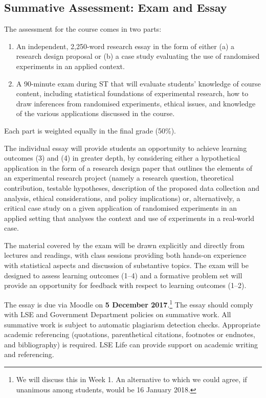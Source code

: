 \documentclass[12pt,a4paper]{article}
\begin{document}
\subsection{Summative Assessment: Exam and Essay}

The assessment for the course comes in two parts:

\begin{enumerate}
\item An independent, 2,250-word research essay in the form of either (a) a research design proposal or (b) a case study evaluating the use of randomised experiments in an applied context.
\item A 90-minute exam during ST that will evaluate students' knowledge of course content, including statistical foundations of experimental research, how to draw inferences from randomised experiments, ethical issues, and knowledge of the various applications discussed in the course.
\end{enumerate}

\noindent Each part is weighted equally in the final grade (50\%).

The individual essay will provide students an opportunity to achieve learning outcomes (3) and (4) in greater depth, by considering either a hypothetical application in the form of a research design paper that outlines the elements of an experimental research project (namely a research question, theoretical contribution, testable hypotheses, description of the proposed data collection and analysis, ethical considerations, and policy implications) or, alternatively, a critical case study on a given application of randomised experiments in an applied setting that analyses the context and use of experiments in a real-world case.

The material covered by the exam will be drawn explicitly and directly from lectures and readings, with class sessions providing both hands-on experience with statistical aspects and discussion of substantive topics. The exam will be designed to assess learning outcomes (1--4) and a formative problem set will provide an opportunity for feedback with respect to learning outcomes (1--2).

The essay is due via Moodle on \textbf{5 December 2017}.\footnote{We will discuss this in Week 1. An alternative to which we could agree, if unanimous among students, would be 16 January 2018.} The essay should comply with LSE and Government Department policies on summative work. All summative work is subject to automatic plagiarism detection checks. Appropriate academic referencing (quotations, parenthetical citations, footnotes or endnotes, and bibliography) is required. LSE Life can provide support on academic writing and referencing.
\end{document}
